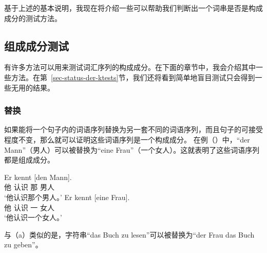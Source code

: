 基于上述的基本说明，我现在将介绍一些可以帮助我们判断出一个词串是否是构成成分的测试方法。


\subsection{组成成分测试}
有许多方法可以用来测试词汇序列的构成成分。在下面的章节中，我会介绍其中一些方法。在第~\ref{sec-status-der-ktests}节，我们还将看到简单地盲目测试只会得到一些无用的结果。

\subsubsection{替换}
如果能将一个句子内的词语序列替换为另一套不同的词语序列，而且句子的可接受程度不变，那么就可以证明这些词语序列是一个构成成分。
在例（）中，“der Mann”（男人）可以被替换为“eine Frau”（一个女人）。这就表明了这些词语序列都是组成成分。

\eal
\ex 
\gll Er kennt [den Mann].\\
     他 认识 \spacebr{}那 男人\\
\glt `他认识那个男人。'
\ex 
\gll Er kennt [eine Frau].\\
     他 认识 \spacebr{}一 女人\\
\glt `他认识一个女人。'
\zl

\noindent
与（a）类似的是，字符串“das Buch zu lesen”可以被替换为“der Frau das Buch zu geben”。

